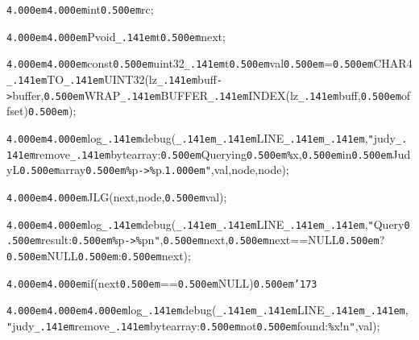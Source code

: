 \noindent
{}{\tt\mc \kern4.000em}{\tt\mc \kern4.000em}int{\tt\mc \kern0.500em}rc;

\noindent
{}{\tt\mc \kern4.000em}{\tt\mc \kern4.000em}Pvoid{\tt\_\kern.141em}t{\tt *}{\tt\mc \kern0.500em}next;

\noindent
{}{\tt\mc \kern4.000em}{\tt\mc \kern4.000em}const{\tt\mc \kern0.500em}uint32{\tt\_\kern.141em}t{\tt\mc \kern0.500em}val{\tt\mc \kern0.500em}={\tt\mc \kern0.500em}CHAR4{\tt\_\kern.141em}TO{\tt\_\kern.141em}UINT32(lz{\tt\_\kern.141em}buff{\tt -}{\tt >}buffer,{\tt\mc \kern0.500em}WRAP{\tt\_\kern.141em}BUFFER{\tt\_\kern.141em}INDEX(lz{\tt\_\kern.141em}buff,{\tt\mc \kern0.500em}offset){\tt\mc \kern0.500em});

\noindent
{}\hfill

\noindent
{}{\tt\mc \kern4.000em}{\tt\mc \kern4.000em}log{\tt\_\kern.141em}debug({\tt\_\kern.141em}{\tt\_\kern.141em}LINE{\tt\_\kern.141em}{\tt\_\kern.141em},{\tt "}judy{\tt\_\kern.141em}remove{\tt\_\kern.141em}bytearray:{\tt\mc \kern0.500em}Querying{\tt\mc \kern0.500em}{\tt\%}x,{\tt\mc \kern0.500em}in{\tt\mc \kern0.500em}JudyL{\tt\mc \kern0.500em}array{\tt\mc \kern0.500em}{\tt\%}p{\tt -}{\tt >}{\tt\%}p.{\tt\mc \kern1.000em}{\tt "},val,node,{\tt *}node);

\noindent
{}\hfill

\noindent
{}{\tt\mc \kern4.000em}{\tt\mc \kern4.000em}JLG(next,{\tt *}node,{\tt\mc \kern0.500em}val);

\noindent
{}\hfill

\noindent
{}{\tt\mc \kern4.000em}{\tt\mc \kern4.000em}log{\tt\_\kern.141em}debug({\tt\_\kern.141em}{\tt\_\kern.141em}LINE{\tt\_\kern.141em}{\tt\_\kern.141em},{\tt "}Query{\tt\mc \kern0.500em}result:{\tt\mc \kern0.500em}{\tt\%}p{\tt -}{\tt >}{\tt\%}p{\tt{}}n{\tt "},{\tt\mc \kern0.500em}next,{\tt\mc \kern0.500em}next==NULL{\tt\mc \kern0.500em}?{\tt\mc \kern0.500em}NULL{\tt\mc \kern0.500em}:{\tt\mc \kern0.500em}{\tt *}next);

\noindent
{}\hfill

\noindent
{}{\tt\mc \kern4.000em}{\tt\mc \kern4.000em}if(next{\tt\mc \kern0.500em}=={\tt\mc \kern0.500em}NULL){\tt\mc \kern0.500em}{\tt\char'173}

\noindent
{}{\tt\mc \kern4.000em}{\tt\mc \kern4.000em}{\tt\mc \kern4.000em}log{\tt\_\kern.141em}debug({\tt\_\kern.141em}{\tt\_\kern.141em}LINE{\tt\_\kern.141em}{\tt\_\kern.141em},{\tt "}judy{\tt\_\kern.141em}remove{\tt\_\kern.141em}bytearray:{\tt\mc \kern0.500em}not{\tt\mc \kern0.500em}found:{\tt\%}x!{\tt{}}n{\tt "},val);


